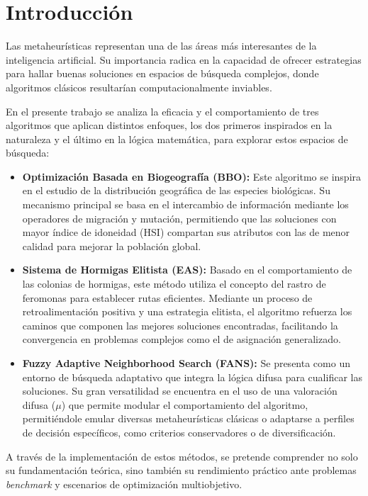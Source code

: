\section{Introducción}

Las metaheurísticas representan una de las áreas más interesantes de la inteligencia artificial. 
Su importancia radica en la capacidad de ofrecer estrategias para hallar buenas soluciones en 
espacios de búsqueda complejos, donde algoritmos clásicos resultarían computacionalmente inviables. 

En el presente trabajo se analiza la eficacia y el comportamiento de tres algoritmos que aplican distintos 
enfoques, los dos primeros inspirados en la naturaleza y el último en la lógica matemática, para explorar 
estos espacios de búsqueda:

\begin{itemize}
    \item \textbf{Optimización Basada en Biogeografía (BBO):} Este algoritmo se inspira en el estudio de la 
    distribución geográfica de las especies biológicas. 
    Su mecanismo principal se basa en el intercambio de información mediante los operadores de migración
    y mutación, permitiendo que las soluciones con mayor índice de idoneidad (HSI) compartan sus atributos 
    con las de menor calidad para mejorar la población global.
    
    \item \textbf{Sistema de Hormigas Elitista (EAS):} Basado en el comportamiento de las colonias de hormigas, 
    este método utiliza el concepto del rastro de feromonas para establecer rutas eficientes. 
    Mediante un proceso de retroalimentación positiva y una estrategia elitista, el algoritmo refuerza los caminos 
    que componen las mejores soluciones encontradas, facilitando la convergencia en problemas complejos como el de 
    asignación generalizado.
    
    \item \textbf{Fuzzy Adaptive Neighborhood Search (FANS):} Se presenta como un entorno de búsqueda adaptativo 
    que integra la lógica difusa para cualificar las soluciones. 
    Su gran versatilidad se encuentra en el uso de una valoración difusa ($\mu$) que permite modular el comportamiento 
    del algoritmo, permitiéndole emular diversas metaheurísticas clásicas o adaptarse a perfiles de decisión específicos, 
    como criterios conservadores o de diversificación.

\end{itemize}

A través de la implementación de estos métodos, se pretende comprender no solo su fundamentación teórica, sino también su rendimiento práctico ante problemas \textit{benchmark} y escenarios de optimización multiobjetivo.